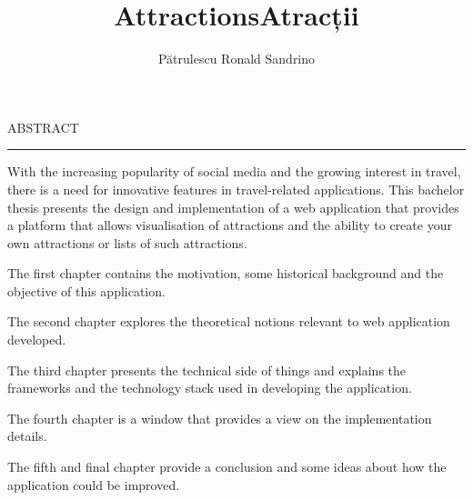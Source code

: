 \documentclass[12pt]{report}
\begin{document}
\title{Attractions}					   
\author{Pătrulescu Ronald Sandrino}											
				
\maketitle

\title{Atracții}

\maketitle

{} 

\cleardoublepage
ABSTRACT
\vspace{0.5cm}	
\hrule
\vspace{0.5cm}	

\par With the increasing popularity of social media and the growing interest in travel, there is a need for innovative features in travel-related applications. This bachelor thesis presents the design and implementation of a web application that provides a platform that allows visualisation of attractions and the ability to create your own attractions or lists of such attractions.

\par The first chapter contains the motivation, some historical background and the objective of this application.

\par The second chapter explores the theoretical notions relevant to web application developed.

\par The third chapter presents the technical side of things and explains the frameworks and the technology stack used in developing the application.

\par The fourth chapter is a window that provides a view on the implementation details.

\par The fifth and final chapter provide a conclusion and some ideas about how the application could be improved.



\tableofcontents


\newpage
{}










\end{document}
